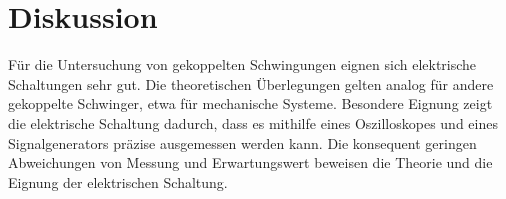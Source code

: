 \section{Diskussion}
\label{sec:Diskussion}



Für die Untersuchung von gekoppelten Schwingungen eignen sich elektrische Schaltungen sehr gut.
Die theoretischen Überlegungen gelten analog für andere gekoppelte Schwinger, etwa für mechanische Systeme.
Besondere Eignung zeigt die elektrische Schaltung dadurch, dass es mithilfe eines Oszilloskopes und eines Signalgenerators präzise ausgemessen werden kann.
Die konsequent geringen Abweichungen von Messung und Erwartungswert beweisen die Theorie und die Eignung der elektrischen Schaltung.
